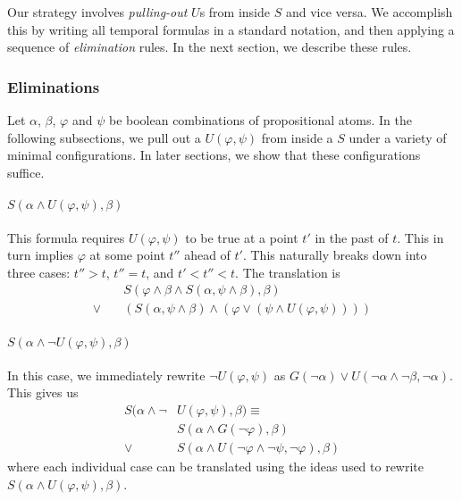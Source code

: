 \documentclass[a4paper,UKenglish,cleveref, autoref, thm-restate]{lipics-v2021}
\begin{document}
Our strategy involves \textit{pulling-out} $U$s from inside $S$ and vice versa. We accomplish this by writing all temporal formulas in a standard notation, and then applying a sequence of \textit{elimination} rules. In the next section, we describe these rules.

\subsubsection{Eliminations}

Let $\alpha$, $\beta$, $\varphi$ and $\psi$ be boolean combinations of propositional atoms. In the following subsections, we pull out a $U(\varphi, \psi)$ from inside a $S$ under a variety of minimal configurations. In later sections, we show that these configurations suffice.

\paragraph*{$S(\alpha \land U(\varphi, \psi), \beta)$}
This formula requires $U(\varphi, \psi)$ to be true at a point $t'$ in the past of $t$. This in turn implies $\varphi$ at some point $t''$ ahead of $t'$. This naturally breaks down into three cases: $t'' > t$, $t'' = t$, and $t' < t'' < t$. The translation is
\begin{equation*}
    \begin{aligned}
        &S(\varphi \land \beta \land S(\alpha, \psi \land \beta), \beta)\\
        \lor \quad &\left(S(\alpha, \psi \land \beta) \land \left(\varphi \lor \left(\psi \land U(\varphi, \psi) \right) \right) \right)
    \end{aligned}
\end{equation*}

\paragraph*{$S(\alpha \land \lnot U(\varphi, \psi), \beta)$}
In this case, we immediately rewrite $\lnot U(\varphi, \psi)$ as $G(\lnot \alpha) \lor U(\lnot \alpha \land \lnot \beta, \lnot \alpha)$. This gives us
\begin{equation*}
    \begin{aligned}
        S(\alpha \land \lnot &U(\varphi, \psi), \beta) \equiv\\
        &S(\alpha \land G(\lnot \varphi), \beta) \\
        \lor \quad &S(\alpha \land U(\lnot \varphi \land \lnot \psi, \lnot \varphi), \beta)
    \end{aligned}
\end{equation*}
where each individual case can be translated using the ideas used to rewrite $S(\alpha \land U(\varphi, \psi), \beta)$.
\end{document}
